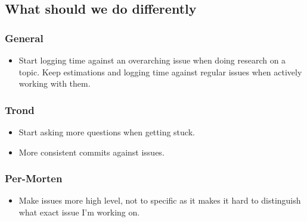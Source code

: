 \documentclass{article}
\begin{document}
\subsection*{What should we do differently}
\subsubsection*{General}
\begin{itemize}
    \item
    Start logging time against an overarching issue when doing research on a topic.
    Keep estimations and logging time against regular issues when actively working with them.
\end{itemize}

\subsubsection*{Trond}
\begin{itemize}
    \item 
    Start asking more questions when getting stuck.

    \item
    More consistent commits against issues.
\end{itemize}

\subsubsection*{Per-Morten}
\begin{itemize}
    \item
    Make issues more high level, not to specific as it makes it hard to distinguish what exact issue I'm working on. 
\end{itemize}
\end{document}
